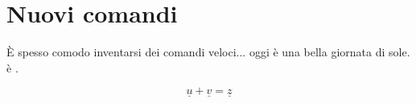 \documentclass{article}
\newcommand{\eee}{\`e }%
\newcommand{\EEE}{\`E\xspace}
\newcommand{\vect}[1]{\underline{#1}}
\begin{document}
\section{Nuovi comandi}

\EEE spesso comodo inventarsi dei comandi veloci... oggi \eee una bella giornata di sole. \eee.

\[
\vect{u} + \vect{v} = \vect{z}
\]
\end{document}
